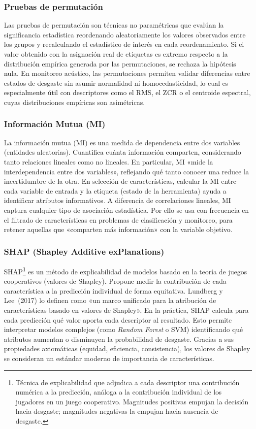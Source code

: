 \documentclass[12pt, letterpaper]{report}
\begin{document}
\subsubsection{Pruebas de permutación}

Las pruebas de permutación son técnicas no paramétricas que evalúan la significancia estadística reordenando aleatoriamente los valores observados entre los grupos y recalculando el estadístico de interés en cada reordenamiento. Si el valor obtenido con la asignación real de etiquetas es extremo respecto a la distribución empírica generada por las permutaciones, se rechaza la hipótesis nula. En monitoreo acústico, las permutaciones permiten validar diferencias entre estados de desgaste sin asumir normalidad ni homocedasticidad, lo cual es especialmente útil con descriptores como el RMS, el ZCR o el centroide espectral, cuyas distribuciones empíricas son asimétricas.

\subsubsection{Información Mutua (MI)}

La información mutua (MI) es una medida de dependencia entre dos variables (entidades aleatorias). Cuantifica cuánta información comparten, considerando tanto relaciones lineales como no lineales. En particular, MI «mide la interdependencia entre dos variables», reflejando qué tanto conocer una reduce la incertidumbre de la otra. En selección de características, calcular la MI entre cada variable de entrada y la etiqueta (estado de la herramienta) ayuda a identificar atributos informativos. A diferencia de correlaciones lineales, MI captura cualquier tipo de asociación estadística. Por ello se usa con frecuencia en el filtrado de características en problemas de clasificación y monitoreo, para retener aquellas que «comparten más información» con la variable objetivo.

\subsubsection{SHAP (Shapley Additive exPlanations)}

SHAP\footnote{Técnica de explicabilidad que adjudica a cada descriptor una contribución numérica a la predicción, análoga a la contribución individual de los jugadores en un juego cooperativo. Magnitudes positivas empujan la decisión hacia desgaste; magnitudes negativas la empujan hacia ausencia de desgaste.} es un método de explicabilidad de modelos basado en la teoría de juegos cooperativos (valores de Shapley). Propone medir la contribución de cada característica a la predicción individual de forma equitativa. Lundberg y Lee~(2017) lo definen como «un marco unificado para la atribución de características basado en valores de Shapley». En la práctica, SHAP calcula para cada predicción qué valor aporta cada descriptor al resultado. Esto permite interpretar modelos complejos (como \textit{Random Forest} o SVM) identificando qué atributos aumentan o disminuyen la probabilidad de desgaste. Gracias a sus propiedades axiomáticas (equidad, eficiencia, consistencia), los valores de Shapley se consideran un estándar moderno de importancia de características.
\end{document}
